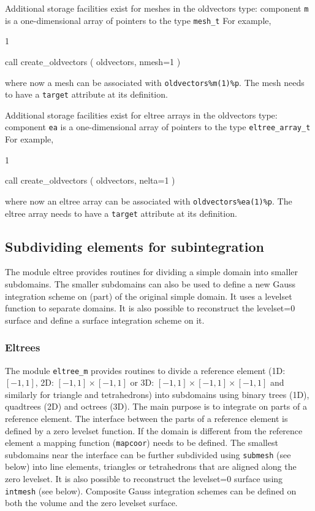 Additional storage facilities exist for meshes in the oldvectors type:
component \texttt{m} 
is a one-dimensional array of pointers to the type \texttt{mesh\_t}
For example,
\begin{listing}{1}
   
   call create_oldvectors ( oldvectors, nmesh=1 )

\end{listing}
where now a mesh can be associated with \texttt{oldvectors\%m(1)\%p}.
The mesh needs to have a \texttt{target} attribute at its definition.

Additional storage facilities exist for eltree arrays in the oldvectors type:
component \texttt{ea} 
is a one-dimensional array of pointers to the type \texttt{eltree\_array\_t}
For example,
\begin{listing}{1}
   
   call create_oldvectors ( oldvectors, nelta=1 )

\end{listing}
where now an eltree array can be associated with \texttt{oldvectors\%ea(1)\%p}.
The eltree array needs to have a \texttt{target} attribute at its definition.

\subsection{Subdividing elements for subintegration}
\label{sec:subdivide}

The module eltree provides routines for dividing a simple domain into
smaller subdomains.
The smaller subdomains can also be used to define a new Gauss
integration scheme on (part) of the original simple domain. It uses a levelset function to
separate domains. It is also possible to reconstruct the levelset=0 surface and define
a surface integration scheme on it.

\subsubsection{Eltrees}
\label{sec:eltree}

The module \texttt{eltree\_m} provides routines to divide a
reference element (1D: $[-1,1]$, 2D: $[-1,1]\times[-1,1]$ or
3D: $[-1,1]\times[-1,1]\times[-1,1]$ and similarly for triangle and tetrahedrons)
into subdomains using binary trees
(1D), quadtrees (2D) and octrees (3D). The main purpose is to integrate on
parts of a reference element.
The interface between the parts of a reference element
is defined by a zero levelset function.
If the domain is different from the reference element a mapping function
(\texttt{mapcoor}) needs to be defined.
The smallest subdomains near the interface can be further subdivided using
\texttt{submesh} (see below) into
line elements, triangles or tetrahedrons that are aligned along the zero
levelset.
It is also possible to reconstruct the levelset=0 surface using
\texttt{intmesh} (see below).
Composite Gauss integration schemes can be defined on both the volume and the
zero levelset surface.

